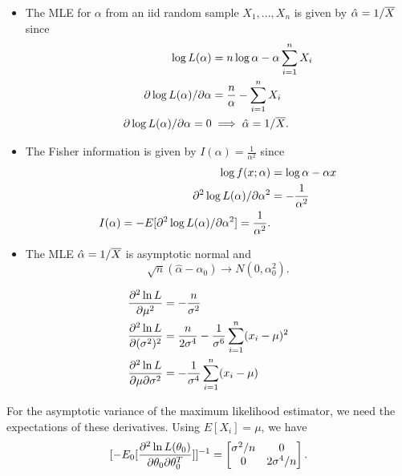 \begin{refsection}
\begin{example}
\begin{itemize}
	\item The MLE for $\alpha$ from an iid random sample $X_1,...,X_n$ is given by $\hat{\alpha} = 1/\overline{X}$ since
	\begin{align*}
	\log L(\alpha) &= n\log \alpha - \alpha \sum_{i=1}^n X_i \\
	\partial \log L(\alpha) /\partial \alpha &= \frac{n}{\alpha} - \sum_{i=1}^n X_i \\
	\partial \log L(\alpha) /\partial \alpha = 0 &\implies \hat{\alpha} = 1/\overline{X}.
	\end{align*}
	\item The Fisher information is given by $I(\alpha) = \frac{1}{\alpha^2}$ since 
	\begin{align*}
	\log f(x;\alpha) &= \log \alpha - \alpha x \\
	\partial^2 \log L(\alpha) /\partial \alpha^2 &= -\frac{1}{\alpha^2} \\
	I(\alpha) = -E[\partial^2 \log L(\alpha) /\partial \alpha^2] = \frac{1}{\alpha^2}.
	\end{align*}
	 \item The MLE $\hat{\alpha} = 1/\overline{X}$ is asymptotic normal and
	 $$\sqrt{n}(\hat{\alpha} - \alpha_0) \to N(0, \alpha_0^2).$$
\end{itemize}	
	
\end{example}

\begin{example}\cite[548]{greene2017econometric}
	
	\begin{align*}
	\frac{\partial^2 \ln L}{\partial \mu^2} &= -\frac{n}{\sigma^2} \\
	\frac{\partial^2 \ln L}{\partial (\sigma^2)^2} &= \frac{n}{2\sigma^4} - \frac{1}{\sigma^6}\sum_{i=1}^n (x_i - \mu)^2 \\
	\frac{\partial^2 \ln L}{\partial \mu \partial \sigma^2} &= -\frac{1}{\sigma^4}\sum_{i=1}^n (x_i - \mu)
	\end{align*}	
	
	For the asymptotic variance of the maximum likelihood estimator, we need the expectations of these derivatives. Using $E[X_i] = \mu$, we have
	$$[-E_0[\frac{\partial^2 \ln L(\theta_0)}{\partial \theta_0 \partial \theta_0^T}]]^{-1} = \begin{bmatrix}
	\sigma^2/n & 0 \\
	0 & 2\sigma^4/n
	\end{bmatrix}.$$
\end{example}





\end{refsection}
